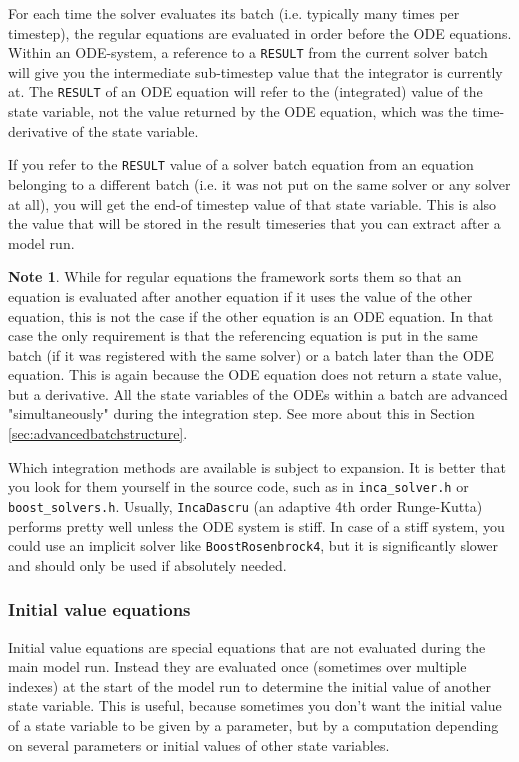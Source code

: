 \documentclass[11pt]{article}
\theoremstyle{definition}
\newtheorem{mynote}{Note}
\newenvironment{note}%
  {\begin{lrbox}{\notebox}%
   \begin{minipage}{\dimexpr\linewidth-2\fboxsep}
   \begin{mynote}}%
  {\end{mynote}%
   \end{minipage}%
   \end{lrbox}%
   \begin{trivlist}
     \item[]\colorbox{silver}{\usebox\notebox}
   \end{trivlist}}
\begin{document}
For each time the solver evaluates its batch (i.e. typically many times per timestep), the regular equations are evaluated in order before the ODE equations. Within an ODE-system, a reference to a {\tt RESULT} from the current solver batch will give you the intermediate sub-timestep value that the integrator is currently at. The {\tt RESULT} of an ODE equation will refer to the (integrated) value of the state variable, not the value returned by the ODE equation, which was the time-derivative of the state variable.

If you refer to the {\tt RESULT} value of a solver batch equation from an equation belonging to a different batch (i.e. it was not put on the same solver or any solver at all), you will get the end-of timestep value of that state variable. This is also the value that will be stored in the result timeseries that you can extract after a model run.

\begin{note}
While for regular equations the framework sorts them so that an equation is evaluated after another equation if it uses the value of the other equation, this is not the case if the other equation is an ODE equation. In that case the only requirement is that the referencing equation is put in the same batch (if it was registered with the same solver) or a batch later than the ODE equation. This is again because the ODE equation does not return a state value, but a derivative. All the state variables of the ODEs within a batch are advanced "simultaneously" during the integration step. See more about this in Section \ref{sec:advancedbatchstructure}.
\end{note}

Which integration methods are available is subject to expansion. It is better that you look for them yourself in the source code, such as in {\tt inca\_solver.h} or {\tt boost\_solvers.h}. Usually, {\tt IncaDascru} (an adaptive 4th order Runge-Kutta) performs pretty well unless the ODE system is stiff. In case of a stiff system, you could use an implicit solver like {\tt BoostRosenbrock4}, but it is significantly slower and should only be used if absolutely needed.

\subsubsection{Initial value equations}

Initial value equations are special equations that are not evaluated during the main model run. Instead they are evaluated once (sometimes over multiple indexes) at the start of the model run to determine the initial value of another state variable. This is useful, because sometimes you don't want the initial value of a state variable to be given by a parameter, but by a computation depending on several parameters or initial values of other state variables.
\end{document}
